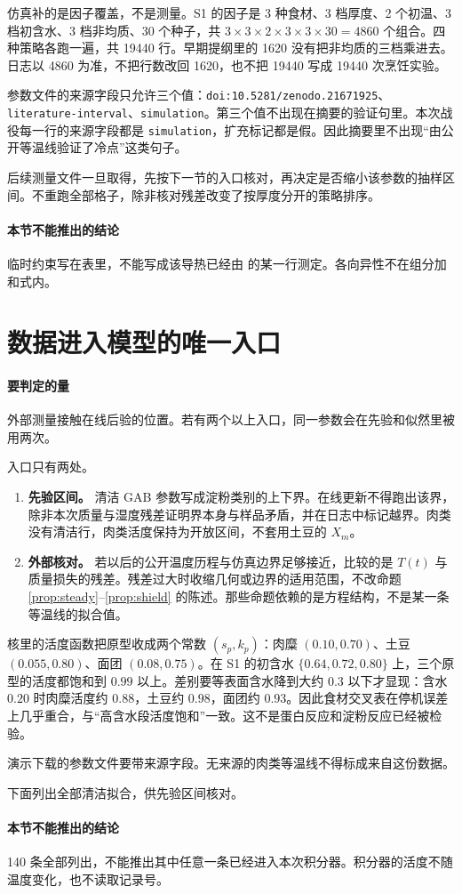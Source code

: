 仿真补的是因子覆盖，不是测量。S1 的因子是 3 种食材、3 档厚度、2 个初温、3 档初含水、3 档非均质、30 个种子，共 \(3\times 3\times 2\times 3\times 3\times 30=4860\) 个组合。四种策略各跑一遍，共 19440 行。早期提纲里的 1620 没有把非均质的三档乘进去。日志以 4860 为准，不把行数改回 1620，也不把 19440 写成 19440 次烹饪实验。

参数文件的来源字段只允许三个值：\texttt{doi:10.5281/zenodo.21671925}、\texttt{literature-interval}、\texttt{simulation}。第三个值不出现在摘要的验证句里。本次战役每一行的来源字段都是 \texttt{simulation}，扩充标记都是假。因此摘要里不出现“由公开等温线验证了冷点”这类句子。

后续测量文件一旦取得，先按下一节的入口核对，再决定是否缩小该参数的抽样区间。不重跑全部格子，除非核对残差改变了按厚度分开的策略排序。

\paragraph{本节不能推出的结论}
临时约束写在表里，不能写成该导热已经由 \cite{choi1986} 的某一行测定。各向异性不在组分加和式内。

\section{数据进入模型的唯一入口}

\paragraph{要判定的量}
外部测量接触在线后验的位置。若有两个以上入口，同一参数会在先验和似然里被用两次。

入口只有两处。

\begin{enumerate}
\item \textbf{先验区间。} 清洁 GAB 参数写成淀粉类别的上下界。在线更新不得跑出该界，除非本次质量与湿度残差证明界本身与样品矛盾，并在日志中标记越界。肉类没有清洁行，肉类活度保持为开放区间，不套用土豆的 \(X_m\)。
\item \textbf{外部核对。} 若以后的公开温度历程与仿真边界足够接近，比较的是 \(T(t)\) 与质量损失的残差。残差过大时收缩几何或边界的适用范围，不改命题 \ref{prop:steady}--\ref{prop:shield} 的陈述。那些命题依赖的是方程结构，不是某一条等温线的拟合值。
\end{enumerate}

核里的活度函数把原型收成两个常数 \((s_p,k_p)\)：肉糜 \((0.10,0.70)\)、土豆 \((0.055,0.80)\)、面团 \((0.08,0.75)\)。在 S1 的初含水 \(\{0.64,0.72,0.80\}\) 上，三个原型的活度都饱和到 \(0.99\) 以上。差别要等表面含水降到大约 \(0.3\) 以下才显现：含水 \(0.20\) 时肉糜活度约 \(0.88\)，土豆约 \(0.98\)，面团约 \(0.93\)。因此食材交叉表在停机误差上几乎重合，与“高含水段活度饱和”一致。这不是蛋白反应和淀粉反应已经被检验。

演示下载的参数文件要带来源字段。无来源的肉类等温线不得标成来自这份数据。

下面列出全部清洁拟合，供先验区间核对。



\paragraph{本节不能推出的结论}
140 条全部列出，不能推出其中任意一条已经进入本次积分器。积分器的活度不随温度变化，也不读取记录号。
